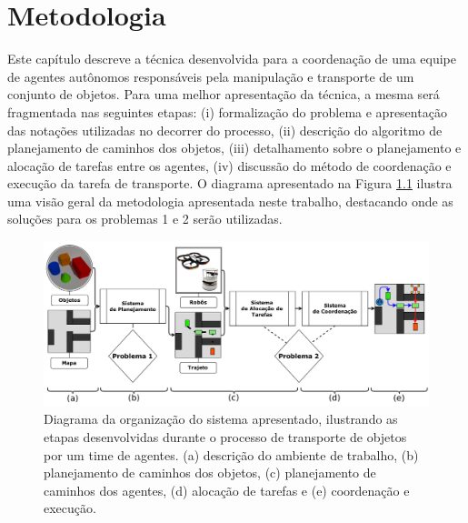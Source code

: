 \chapter{Metodologia} %
\label{cha:metodologia}

Este capítulo descreve a técnica desenvolvida para a coordenação de uma equipe de agentes autônomos responsáveis pela manipulação e transporte de um conjunto de objetos.
Para uma melhor apresentação da técnica, a mesma será fragmentada nas seguintes etapas:
(i) formalização do problema e apresentação das notações utilizadas no decorrer do processo,
(ii) descrição do algoritmo de planejamento de caminhos dos objetos,
(iii) detalhamento sobre o planejamento e alocação de tarefas entre os agentes,
(iv) discussão do método de coordenação e execução da tarefa de transporte.
O diagrama apresentado na Figura \ref{fig:diagrama_geral} ilustra uma visão geral da metodologia apresentada neste trabalho, destacando onde as soluções para os problemas 1 e 2 serão utilizadas.

\begin{figure}[h!]
  \centering
  \includegraphics[width=1\textwidth]{img/001-DiagramaGeral2.png}
  \caption[Diagrama geral da Metodologia do trabalho]{Diagrama da organização do sistema apresentado, ilustrando as etapas desenvolvidas durante o processo de transporte de objetos por um time de agentes. (a) descrição do ambiente de trabalho, (b) planejamento de caminhos dos objetos, (c) planejamento de caminhos dos agentes, (d) alocação de tarefas e (e) coordenação e execução.}
  \label{fig:diagrama_geral}
\end{figure}

